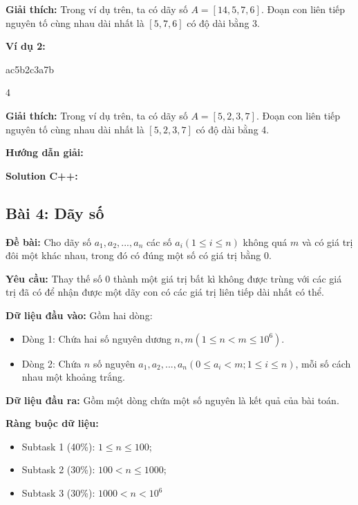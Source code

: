 \documentclass[12pt]{scrartcl}  %
\begin{document}
\textbf{Giải thích:}
Trong ví dụ trên, ta có dãy số $A = [14, 5, 7, 6]$. Đoạn con liên tiếp nguyên tố cùng nhau dài nhất là $[5, 7, 6]$ có độ dài bằng 3.

\textbf{Ví dụ 2:}

\begin{tcolorbox}[colback=gray!5!white, colframe=blue!50!black, title=Input]
ac5b2c3a7b
\end{tcolorbox}
\begin{tcolorbox}[colback=gray!5!white, colframe=green!50!black, title=Output]
4
\end{tcolorbox}

\textbf{Giải thích:}
Trong ví dụ trên, ta có dãy số $A = [5, 2, 3, 7]$. Đoạn con liên tiếp nguyên tố cùng nhau dài nhất là $[5, 2, 3, 7]$ có độ dài bằng 4.

\textbf{Hướng dẫn giải:}

\textbf{Solution C++:}

\subsection{Bài 4: Dãy số}
\textbf{Đề bài:}
Cho dãy số $a_1, a_2, ... , a_n$ các số $a_i (1 \leq i \leq n)$ không quá $m$ và có giá trị đôi một khác nhau, trong đó có đúng một số có giá trị bằng $0$.

\textbf{Yêu cầu:}
Thay thế số $0$ thành một giá trị bất kì không được trùng với các giá trị đã có để nhận được một dãy con có các giá trị liên tiếp dài nhất có thể. 

\textbf{Dữ liệu đầu vào:}
Gồm hai dòng:
\begin{itemize}
    \item Dòng 1: Chứa hai số nguyên dương $n, m (1 \leq n < m \leq 10^6)$.
    \item Dòng 2: Chứa $n$ số nguyên $a_1, a_2, ... , a_n (0 \leq a_i < m; 1 \leq i \leq n)$, mỗi số cách nhau một khoảng trắng.
\end{itemize}

\textbf{Dữ liệu đầu ra:}
Gồm một dòng chứa một số nguyên là kết quả của bài toán.

\textbf{Ràng buộc dữ liệu:}
\begin{itemize}
    \item Subtask 1 (40\%): $1 \leq n \leq 100$;
    \item Subtask 2 (30\%): $100 < n \leq 1000$;
    \item Subtask 3 (30\%): $1000 < n < 10^6$
\end{itemize}
\end{document}
